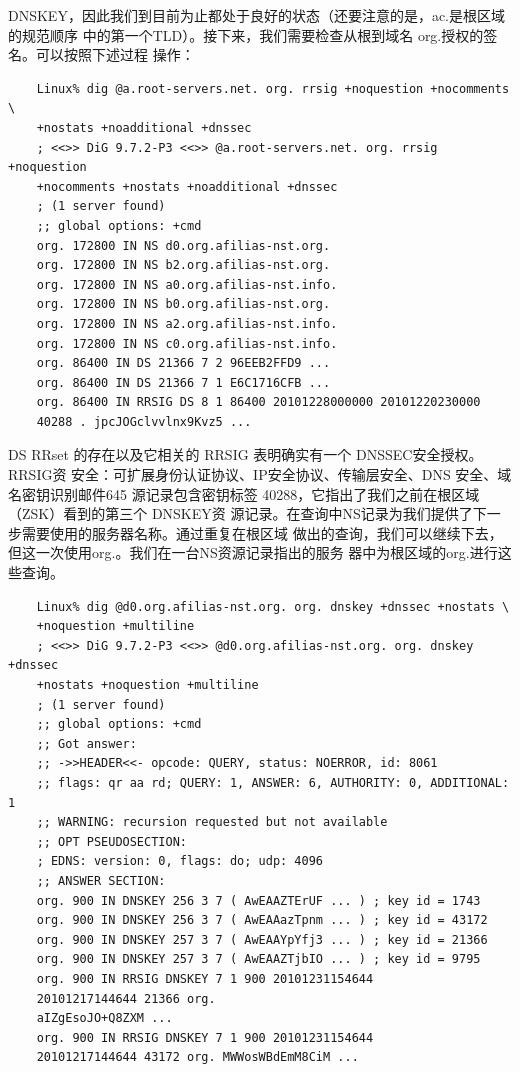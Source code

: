 DNSKEY，因此我们到目前为止都处于良好的状态（还要注意的是，ac.是根区域的规范顺序
中的第一个TLD）。接下来，我们需要检查从根到域名 org.授权的签名。可以按照下述过程
操作：
\begin{verbatim}
    Linux% dig @a.root-servers.net. org. rrsig +noquestion +nocomments \
    +nostats +noadditional +dnssec
    ; <<>> DiG 9.7.2-P3 <<>> @a.root-servers.net. org. rrsig +noquestion
    +nocomments +nostats +noadditional +dnssec
    ; (1 server found)
    ;; global options: +cmd
    org. 172800 IN NS d0.org.afilias-nst.org.
    org. 172800 IN NS b2.org.afilias-nst.org.
    org. 172800 IN NS a0.org.afilias-nst.info.
    org. 172800 IN NS b0.org.afilias-nst.org.
    org. 172800 IN NS a2.org.afilias-nst.info.
    org. 172800 IN NS c0.org.afilias-nst.info.
    org. 86400 IN DS 21366 7 2 96EEB2FFD9 ...
    org. 86400 IN DS 21366 7 1 E6C1716CFB ...
    org. 86400 IN RRSIG DS 8 1 86400 20101228000000 20101220230000
    40288 . jpcJOGclvvlnx9Kvz5 ...
\end{verbatim}
DS RRset 的存在以及它相关的 RRSIG 表明确实有一个 DNSSEC安全授权。RRSIG资
安全：可扩展身份认证协议、IP安全协议、传输层安全、DNS 安全、域名密钥识别邮件645
源记录包含密钥标签 40288，它指出了我们之前在根区域（ZSK）看到的第三个 DNSKEY资
源记录。在查询中NS记录为我们提供了下一步需要使用的服务器名称。通过重复在根区域
做出的查询，我们可以继续下去，但这一次使用org.。我们在一台NS资源记录指出的服务
器中为根区域的org.进行这些查询。
\begin{verbatim}
    Linux% dig @d0.org.afilias-nst.org. org. dnskey +dnssec +nostats \
    +noquestion +multiline
    ; <<>> DiG 9.7.2-P3 <<>> @d0.org.afilias-nst.org. org. dnskey +dnssec
    +nostats +noquestion +multiline
    ; (1 server found)
    ;; global options: +cmd
    ;; Got answer:
    ;; ->>HEADER<<- opcode: QUERY, status: NOERROR, id: 8061
    ;; flags: qr aa rd; QUERY: 1, ANSWER: 6, AUTHORITY: 0, ADDITIONAL: 1
    ;; WARNING: recursion requested but not available
    ;; OPT PSEUDOSECTION:
    ; EDNS: version: 0, flags: do; udp: 4096
    ;; ANSWER SECTION:
    org. 900 IN DNSKEY 256 3 7 ( AwEAAZTErUF ... ) ; key id = 1743
    org. 900 IN DNSKEY 256 3 7 ( AwEAAazTpnm ... ) ; key id = 43172
    org. 900 IN DNSKEY 257 3 7 ( AwEAAYpYfj3 ... ) ; key id = 21366
    org. 900 IN DNSKEY 257 3 7 ( AwEAAZTjbIO ... ) ; key id = 9795
    org. 900 IN RRSIG DNSKEY 7 1 900 20101231154644
    20101217144644 21366 org.
    aIZgEsoJO+Q8ZXM ...
    org. 900 IN RRSIG DNSKEY 7 1 900 20101231154644
    20101217144644 43172 org. MWWosWBdEmM8CiM ...
\end{verbatim}
